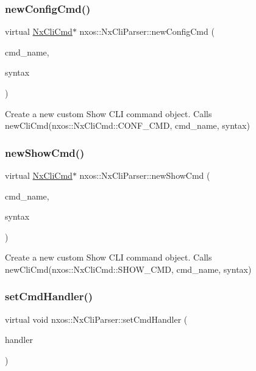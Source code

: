 \subsubsection{\texorpdfstring{new\+Config\+Cmd()}{newConfigCmd()}}
{\footnotesize\ttfamily virtual \mbox{\hyperlink{classnxos_1_1_nx_cli_cmd}{Nx\+Cli\+Cmd}}$\ast$ nxos\+::\+Nx\+Cli\+Parser\+::new\+Config\+Cmd (\begin{DoxyParamCaption}\item[{const char $\ast$}]{cmd\+\_\+name,  }\item[{const char $\ast$}]{syntax }\end{DoxyParamCaption})\hspace{0.3cm}{\ttfamily [pure virtual]}}

Create a new custom Show C\+LI command object. Calls new\+Cli\+Cmd(nxos\+::\+Nx\+Cli\+Cmd\+::\+C\+O\+N\+F\+\_\+\+C\+M\+D, cmd\+\_\+name, syntax) \mbox{\label{classnxos_1_1_nx_cli_parser_ac07fa22d7d83d4c9015ea1f3976163d8}} 
\subsubsection{\texorpdfstring{new\+Show\+Cmd()}{newShowCmd()}}
{\footnotesize\ttfamily virtual \mbox{\hyperlink{classnxos_1_1_nx_cli_cmd}{Nx\+Cli\+Cmd}}$\ast$ nxos\+::\+Nx\+Cli\+Parser\+::new\+Show\+Cmd (\begin{DoxyParamCaption}\item[{const char $\ast$}]{cmd\+\_\+name,  }\item[{const char $\ast$}]{syntax }\end{DoxyParamCaption})\hspace{0.3cm}{\ttfamily [pure virtual]}}

Create a new custom Show C\+LI command object. Calls new\+Cli\+Cmd(nxos\+::\+Nx\+Cli\+Cmd\+::\+S\+H\+O\+W\+\_\+\+C\+M\+D, cmd\+\_\+name, syntax) \mbox{\label{classnxos_1_1_nx_cli_parser_a711e36619a40625ebf62b59693529d88}} 
\subsubsection{\texorpdfstring{set\+Cmd\+Handler()}{setCmdHandler()}}
{\footnotesize\ttfamily virtual void nxos\+::\+Nx\+Cli\+Parser\+::set\+Cmd\+Handler (\begin{DoxyParamCaption}\item[{\mbox{\hyperlink{classnxos_1_1_nx_cmd_handler}{Nx\+Cmd\+Handler}} $\ast$}]{handler }\end{DoxyParamCaption})\hspace{0.3cm}{\ttfamily [pure virtual]}}

